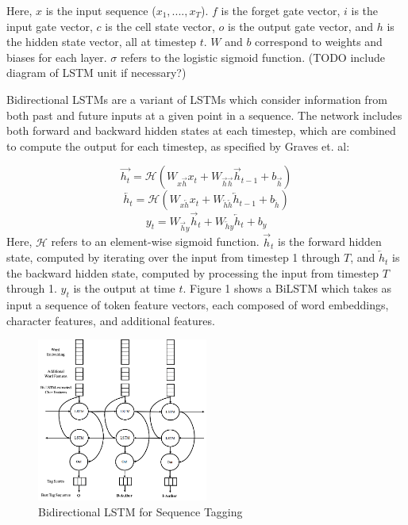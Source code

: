 \documentclass{acm_proc_article-sp}
\begin{document}
Here, $x$ is the input sequence ($x_1,....,x_T$). $f$ is the forget gate vector, $i$ is the input gate vector, $c$ is the cell state vector, $o$ is the output gate vector, and $h$ is the hidden state vector, all at timestep $t$. $W$ and $b$ correspond to weights and biases for each layer. \cite{graves2013hybrid} $\sigma$ refers to the logistic sigmoid function. (TODO include diagram of LSTM unit if necessary?)

Bidirectional LSTMs are a variant of LSTMs which consider information from both past and future inputs at a given point in a sequence. The network includes both forward and backward hidden states at each timestep, which are combined to compute the output for each timestep, as specified by Graves et. al:

\begin{equation}
    \overrightarrow{h_t} = \mathcal{H}(W_{x\overrightarrow{h}}x_t+W_{\overrightarrow{h}\overrightarrow{h}}\overrightarrow{h}_{t-1}+b_{\overrightarrow{h}})
\end{equation}
\begin{equation}
    \overleftarrow{h_t} = \mathcal{H}(W_{x\overleftarrow{h}}x_t+W_{\overleftarrow{h}\overleftarrow{h}}\overleftarrow{h}_{t-1}+b_{\overleftarrow{h}})
\end{equation}
\begin{equation}
    y_t=W_{\overrightarrow{h}y}\overrightarrow{h}_t+W_{\overleftarrow{h}y}\overleftarrow{h}_t+b_y
\end{equation}
Here, $\mathcal{H}$ refers to an element-wise sigmoid function. $\overrightarrow{h}_t$ is the forward hidden state, computed by iterating over the input from timestep 1 through $T$, and $\overleftarrow{h}_t$ is the backward hidden state, computed by processing the input from timestep $T$ through 1. $y_t$ is the output at time $t$. \cite{graves2013hybrid} Figure 1 shows a BiLSTM which takes as input a sequence of token feature vectors, each composed of word embeddings, character features, and additional features.
\begin{figure}[h]
\caption{Bidirectional LSTM for Sequence Tagging}
\centering
\includegraphics[width=0.5\textwidth]{bilstm.png}
\end{figure}
\end{document}

